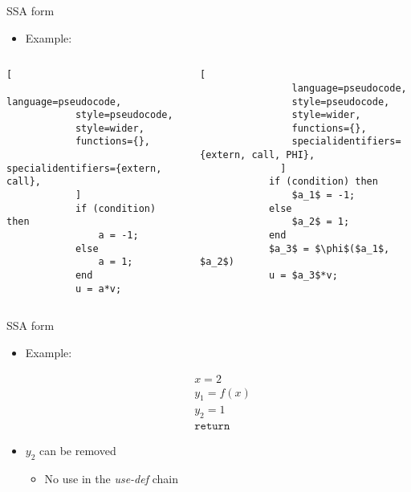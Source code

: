 \begin{frame}[fragile]{SSA form}
\begin{itemize}
    \item Example:
\end{itemize}

\begin{columns}[c]
        \begin{lstlisting}[
            language=pseudocode,
            style=pseudocode,
            style=wider,
            functions={},
            specialidentifiers={extern, call},
            ]
            if (condition) then
                a = -1;
            else
                a = 1;
            end
            u = a*v;
        \end{lstlisting}
        \begin{lstlisting}[
                language=pseudocode,
                style=pseudocode,
                style=wider,
                functions={},
                specialidentifiers={extern, call, PHI},
              ]
            if (condition) then
                $a_1$ = -1;
            else
                $a_2$ = 1;
            end
            $a_3$ = $\phi$($a_1$, $a_2$)
            u = $a_3$*v;
        \end{lstlisting}
\end{columns}
\end{frame}


\begin{frame}[fragile]{SSA form}

\begin{itemize}
    \item Example:

\begin{align}
& x = 2 \nonumber \\
& y_1 = f(x) \nonumber \\
& y_2 = 1 \nonumber \\
& \texttt{return} \nonumber
\end{align}
    \item $y_2$ can be removed
    \begin{itemize}
        \item No use in the \textit{use-def} chain
    \end{itemize}

\end{itemize}
\end{frame}

